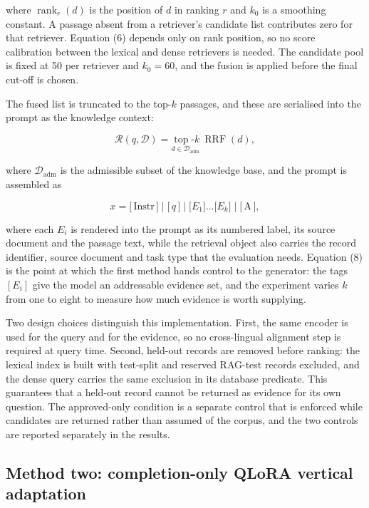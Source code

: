 \documentclass{article}
\DeclareMathOperator{\rank}{rank}
\begin{document}
where $\rank_r(d)$ is the position of $d$ in ranking $r$ and $k_0$ is a smoothing constant. A passage absent from a retriever's candidate list contributes zero for that retriever. Equation (6) depends only on rank position, so no score calibration between the lexical and dense retrievers is needed. The candidate pool is fixed at 50 per retriever and $k_0=60$, and the fusion is applied before the final cut-off is chosen.

The fused list is truncated to the top-$k$ passages, and these are serialised into the prompt as the knowledge context:

\begin{equation}
\mathcal{R}(q,\mathcal{D})=\underset{d\in\mathcal{D}_{\mathrm{adm}}}{\operatorname{top}\text{-}k}\ \operatorname{RRF}(d),
\end{equation}

where $\mathcal{D}_{\mathrm{adm}}$ is the admissible subset of the knowledge base, and the prompt is assembled as

\begin{equation}
x=\big[\,\text{Instr}\,\big]\;\big|\;\big[\,q\,\big]\;\big|\;\big[E_1\big]\ldots\big[E_k\big]\;\big|\;\big[\,\text{A}\,\big],
\end{equation}

where each $E_i$ is rendered into the prompt as its numbered label, its source document and the passage text, while the retrieval object also carries the record identifier, source document and task type that the evaluation needs. Equation (8) is the point at which the first method hands control to the generator: the tags $[E_i]$ give the model an addressable evidence set, and the experiment varies $k$ from one to eight to measure how much evidence is worth supplying.

Two design choices distinguish this implementation. First, the same encoder is used for the query and for the evidence, so no cross-lingual alignment step is required at query time. Second, held-out records are removed before ranking: the lexical index is built with test-split and reserved RAG-test records excluded, and the dense query carries the same exclusion in its database predicate. This guarantees that a held-out record cannot be returned as evidence for its own question. The approved-only condition is a separate control that is enforced while candidates are returned rather than assumed of the corpus, and the two controls are reported separately in the results.

\subsection{Method two: completion-only QLoRA vertical adaptation}
\end{document}
